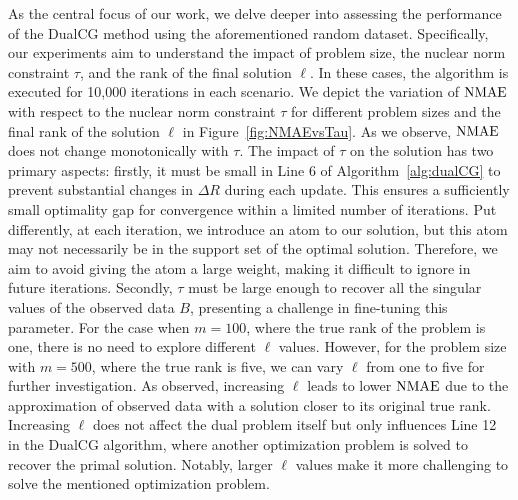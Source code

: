 \documentclass[10pt, twocolumn, reqno, a4paper,oneside]{amsart}
\numberwithin{equation}{section}
\numberwithin{theorem}{section}
\numberwithin{figure}{section}
\numberwithin{table}{section}
\numberwithin{theorem}{section}
\numberwithin{equation}{section}
\begin{document}
As the central focus of our work, we delve deeper into assessing the performance of the DualCG method using the aforementioned random dataset. Specifically, our experiments aim to understand the impact of problem size, the nuclear norm constraint $\tau$, and the rank of the final solution $\ell$.
In these cases, the algorithm is executed for 10,000 iterations in each scenario.
We depict the variation of $\rm NMAE$ with respect to the nuclear norm constraint $\tau$ for different problem sizes and the final rank of the solution $\ell$ in Figure~\ref{fig:NMAEvsTau}.
As we observe, $\rm NMAE$ does not change monotonically with $\tau$.
The impact of $\tau$ on the solution has two primary aspects: firstly, it must be small in Line 6 of Algorithm~\ref{alg:dualCG} to prevent substantial changes in $\Delta R$ during each update. This ensures a sufficiently small optimality gap for convergence within a limited number of iterations. Put differently, at each iteration, we introduce an atom to our solution, but this atom may not necessarily be in the support set of the optimal solution. Therefore, we aim to avoid giving the atom a large weight, making it difficult to ignore in future iterations.
Secondly, $\tau$ must be large enough to recover all the singular values of the observed data $B$, presenting a challenge in fine-tuning this parameter.
For the case when $m = 100$, where the true rank of the problem is one, there is no need to explore different $\ell$ values. However, for the problem size with $m=500$, where the true rank is five, we can vary $\ell$ from one to five for further investigation. As observed, increasing $\ell$ leads to lower $\rm NMAE$ due to the approximation of observed data with a solution closer to its original true rank. Increasing $\ell$ does not affect the dual problem itself but only influences Line 12 in the DualCG algorithm, where another optimization problem is solved to recover the primal solution. Notably, larger $\ell$ values make it more challenging to solve the mentioned optimization problem.
\end{document}
